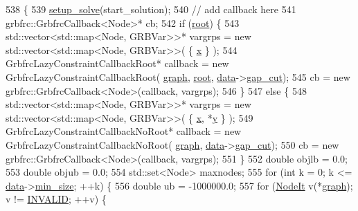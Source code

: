 \begin{DoxyCode}
538                                                                                                 \{
539     \hyperlink{classderegnet_1_1DeregnetModel_a502657403c84cbdc66ad845c56dee339}{setup\_solve}(start\_solution);
540     \textcolor{comment}{// add callback here}
541     grbfrc::GrbfrcCallback<Node>* cb;
542     \textcolor{keywordflow}{if} (\hyperlink{classderegnet_1_1DeregnetModel_a54b20393a0e26d65935d387685d7fe96}{root}) \{
543         std::vector<std::map<Node, GRBVar>>* vargrps = \textcolor{keyword}{new} std::vector<std::map<Node, GRBVar>>( \{ 
      \hyperlink{classderegnet_1_1DeregnetModel_a360c980f3fec4dfbab50e9bb06a933a8}{x} \} );
544         GrbfrcLazyConstraintCallbackRoot* callback = \textcolor{keyword}{new} GrbfrcLazyConstraintCallbackRoot(
      \hyperlink{classderegnet_1_1DeregnetModel_a3cd2f54b8e061ef5bed32708d9bc1ef1}{graph}, \hyperlink{classderegnet_1_1DeregnetModel_a54b20393a0e26d65935d387685d7fe96}{root}, \hyperlink{classderegnet_1_1DeregnetModel_ad5399761cf6293a702f3800bda4806d1}{data}->\hyperlink{classderegnet_1_1DeregnetData_a3637c87366454adc152487fc2f5cfede}{gap\_cut});
545         cb = \textcolor{keyword}{new} grbfrc::GrbfrcCallback<Node>(callback, vargrps);
546     \}
547     \textcolor{keywordflow}{else} \{
548         std::vector<std::map<Node, GRBVar>>* vargrps = \textcolor{keyword}{new} std::vector<std::map<Node, GRBVar>>( \{ 
      \hyperlink{classderegnet_1_1DeregnetModel_a360c980f3fec4dfbab50e9bb06a933a8}{x}, *\hyperlink{classderegnet_1_1DeregnetModel_ae76df61afe302b939165facf3dd21ac8}{y} \} );
549         GrbfrcLazyConstraintCallbackNoRoot* callback = \textcolor{keyword}{new} GrbfrcLazyConstraintCallbackNoRoot(
      \hyperlink{classderegnet_1_1DeregnetModel_a3cd2f54b8e061ef5bed32708d9bc1ef1}{graph}, \hyperlink{classderegnet_1_1DeregnetModel_ad5399761cf6293a702f3800bda4806d1}{data}->\hyperlink{classderegnet_1_1DeregnetData_a3637c87366454adc152487fc2f5cfede}{gap\_cut});
550         cb = \textcolor{keyword}{new} grbfrc::GrbfrcCallback<Node>(callback, vargrps);
551     \}
552     \textcolor{keywordtype}{double} objlb = 0.0;
553     \textcolor{keywordtype}{double} objub = 0.0;
554     std::set<Node> maxnodes;
555     \textcolor{keywordflow}{for} (\textcolor{keywordtype}{int} k = 0; k <= \hyperlink{classderegnet_1_1DeregnetModel_ad5399761cf6293a702f3800bda4806d1}{data}->\hyperlink{classderegnet_1_1AvgdrgntData_a733e0cd627433fca043a7f9b70af18c3}{min\_size}; ++k) \{
556         \textcolor{keywordtype}{double} ub = -1000000.0;
557         \textcolor{keywordflow}{for} (\hyperlink{namespacederegnet_ac34314e1b5f456fc6d1bb9d96316de4a}{NodeIt} v(*\hyperlink{classderegnet_1_1DeregnetModel_a3cd2f54b8e061ef5bed32708d9bc1ef1}{graph}); v != \hyperlink{usinglemon_8hpp_adf770fe2eec438e3758ffe905dbae208}{INVALID}; ++v) \{

\end{DoxyCode}
